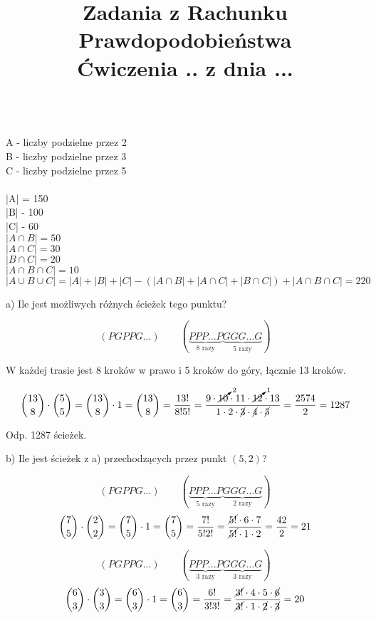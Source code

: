 \documentclass[12pt]{article}
\begin{document}
\title{Zadania z Rachunku Prawdopodobieństwa \\ Ćwiczenia .. z dnia ...}
\date{}
\medskip
{} 
\medskip


\medskip

\medskip\\
A - liczby podzielne przez 2 \\
B - liczby podzielne przez 3 \\
C - liczby podzielne przez 5 \\ \\
|A| = 150  \\
|B| - 100   \\
|C| - 60 \\
$ |A \cap B| = 50 $\\
$|A \cap C| = 30$ \\
$|B \cap C| = 20 $\\
$|A \cap B \cap C| = 10$ \\
$|A \cup B \cup C| = |A| + |B| + |C| - (|A \cap B|  + |A \cap C| + |B \cap C|) + |A \cap B \cap C| = 220  $

\medskip

a) Ile jest możliwych różnych ścieżek tego punktu?

\[(PGPPG...) \qquad 
(\underbrace{PPP...P}_{\displaystyle\text{8 razy}}
\underbrace{GGG...G}_{\displaystyle\text{5 razy}})\]

W każdej trasie jest 8 kroków w prawo i 5 kroków do góry, łącznie 13 kroków.

\[{13 \choose 8} \cdot {5 \choose 5}
={13 \choose 8} \cdot 1={13 \choose 8}
=\frac{13!}{8!5!}
=\frac{9 \cdot \cancelto{2}{10} \cdot 11 \cdot \cancelto{1}{12} \cdot 13}
{1 \cdot 2 \cdot \cancel{3} \cdot \cancel{4} \cdot \cancel{5}}
=\frac{2574}{2}=1287\]

Odp. 1287 ścieżek.

\vspace{1em}

b) Ile jest ścieżek z a) przechodzących przez punkt $(5, 2)$?

\[(PGPPG...) \qquad 
(\underbrace{PPP...P}_{\displaystyle\text{5 razy}}
\underbrace{GGG...G}_{\displaystyle\text{2 razy}})\]
\[{7 \choose 5} \cdot {2 \choose 2}
={7 \choose 5} \cdot 1
={7 \choose 5}
=\frac{7!}{5!2!}
=\frac{\cancel{5!} \cdot 6 \cdot 7}{\cancel{5!} \cdot 1 \cdot 2}
=\frac{42}{2}=21\]

\[(PGPPG...) \qquad 
(\underbrace{PPP...P}_{\displaystyle\text{3 razy}}\underbrace{GGG...G}_{\displaystyle\text{3 razy}})\]
\[{6 \choose 3} \cdot {3 \choose 3}
={6 \choose 3} \cdot 1
={6 \choose 3}
=\frac{6!}{3!3!}
=\frac{\cancel{3!} \cdot 4 \cdot 5 \cdot \cancel{6}}
{\cancel{3!} \cdot 1 \cdot \cancel{2} \cdot \cancel{3}}
=20\]
\end{document}
